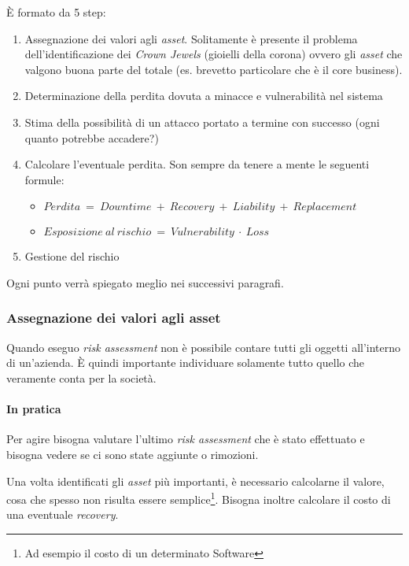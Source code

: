 È formato da 5 step:
\begin{enumerate}
 \item Assegnazione dei valori agli \textit{asset}. Solitamente è presente
il problema dell'identificazione dei \textit{Crown Jewels} (gioielli della
corona) ovvero gli \textit{asset} che valgono buona parte del totale (es.
brevetto particolare che è il core business).
 \item Determinazione della perdita dovuta a minacce e vulnerabilità nel sistema
 \item Stima della possibilità di un attacco portato a termine con successo
(ogni quanto potrebbe accadere?)
 \item Calcolare l'eventuale perdita. Son sempre da tenere a mente le seguenti
formule:
 \begin{itemize}
 	\item $Perdita\ =\ Downtime\ +\ Recovery\ +\ Liability\ +\ Replacement$
 	\item $Esposizione\ al\ rischio\ =\ Vulnerability\ \cdot\ Loss$
 \end{itemize}
 \item Gestione del rischio
\end{enumerate}

Ogni punto verrà spiegato meglio nei successivi paragrafi.


\subsubsection{Assegnazione dei valori agli asset}

Quando eseguo \textit{risk assessment} non è possibile contare tutti gli
oggetti all'interno di un'azienda. È quindi importante individuare solamente
tutto quello che veramente conta per la società.

\paragraph*{In pratica}

Per agire bisogna valutare l'ultimo \textit{risk assessment} che è stato
effettuato e bisogna vedere se ci sono state aggiunte o rimozioni.

Una volta identificati gli \textit{asset} più importanti, è necessario
calcolarne il valore, cosa che spesso non risulta essere semplice\footnote{Ad
esempio il costo di un determinato Software}. Bisogna inoltre calcolare il
costo di una eventuale \textit{recovery}.



